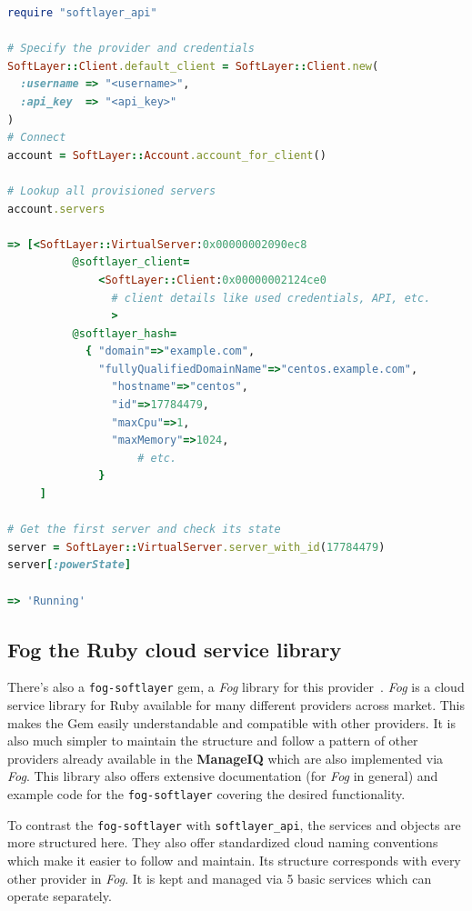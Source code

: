 \begin{lstlisting}[language=Ruby,caption={Example code for the \texttt{softlayer\_api}},label=code:softlayer_api,float=htpb]
require "softlayer_api"

# Specify the provider and credentials
SoftLayer::Client.default_client = SoftLayer::Client.new(
  :username => "<username>",
  :api_key  => "<api_key>"
)
# Connect
account = SoftLayer::Account.account_for_client()

# Lookup all provisioned servers
account.servers

=> [<SoftLayer::VirtualServer:0x00000002090ec8
		  @softlayer_client=
			  <SoftLayer::Client:0x00000002124ce0
				# client details like used credentials, API, etc.
				>
		  @softlayer_hash=
		   	{ "domain"=>"example.com",
		      "fullyQualifiedDomainName"=>"centos.example.com",
		    	"hostname"=>"centos",
		    	"id"=>17784479,
		    	"maxCpu"=>1,
		    	"maxMemory"=>1024,
					# etc.
			  }
	 ]

# Get the first server and check its state
server = SoftLayer::VirtualServer.server_with_id(17784479)
server[:powerState]

=> 'Running'
\end{lstlisting}

\subsection{Fog the Ruby cloud service library}
\label{sub:Fog cloud library}

There's also a \texttt{fog-softlayer} gem, a \emph{Fog} library for this provider~\cite{fog-softlayer}. \emph{Fog} is a cloud service library for Ruby available for many different providers across market. This makes the Gem easily understandable and compatible with other providers. It is also much simpler to maintain the structure and follow a pattern of other providers already available in the \textbf{ManageIQ} which are also implemented via \emph{Fog}. This library also offers extensive documentation (for \emph{Fog} in general) and example code for the \texttt{fog-softlayer} covering the desired functionality.

To contrast the \texttt{fog-softlayer} with \texttt{softlayer\_api}, the services and objects are more structured here. They also offer standardized cloud naming conventions which make it easier to follow and maintain. Its structure corresponds with every other provider in \emph{Fog}. It is kept and managed via 5 basic services which can operate separately.

